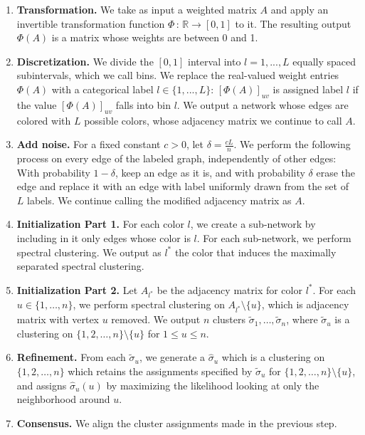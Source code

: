 \documentclass{article}
\begin{document}
\begin{enumerate}
\item \textbf{Transformation.} We take as input a weighted matrix $A$ and apply an invertible transformation function $\Phi \,:\, \mathbb{R} \rightarrow [0,1]$ to it. The resulting output $\Phi(A)$ is a matrix whose weights are between 0 and 1.

\item \textbf{Discretization.} We divide the $[0,1]$ interval into $l=1,...,L$ equally spaced subintervals, which we call bins. We replace the real-valued weight entries $\Phi(A)$ with a categorical label $l \in \{1,...,L\}$: $[\Phi(A)]_{uv}$ is assigned label $l$ if the value $[\Phi(A)]_{uv}$ falls into bin $l$. We output a network whose edges are colored with $L$ possible colors, whose adjacency matrix we continue to call $A$.

\item \textbf{Add noise.} For a fixed constant $c > 0$, let $\delta = \frac{cL}{n}$. We perform the following process on every edge of the labeled graph, independently of other edges: With probability $1-\delta$, keep an edge as it is, and with probability $\delta$ erase the edge and replace it with an edge with label uniformly drawn from the set of $L$ labels. We continue calling the modified adjacency matrix as $A$.

\item \textbf{Initialization Part 1.} For each color $l$, we create a sub-network by including in it only edges whose color is $l$. For each sub-network, we perform spectral clustering. We output as $l^*$ the color that induces the maximally separated spectral clustering. 

\item \textbf{Initialization Part 2.} Let $A_{l^*}$ be the adjacency matrix for color $l^*$. For each $u \in \{1, \dots, n\}$, we perform spectral clustering on $A_{l^*} \setminus \{u\}$, which is adjacency matrix with vertex $u$ removed. We output $n$ clusters $\tilde{\sigma}_1, \dots, \tilde{\sigma}_n$, where $\tilde \sigma_u$ is a clustering on $\{1, 2, \dots, n\} \setminus \{u\}$ for $1 \leq u \leq n$.

\item \textbf{Refinement.} From each $\tilde \sigma_u$, we generate a $\hat \sigma_u$ which is a clustering on $\{1, 2, \dots, n\}$ which retains the assignments specified by $\tilde \sigma_u$ for $\{1, 2, \dots, n\} \setminus \{u\}$, and assigns $\hat \sigma_u(u)$ by maximizing the likelihood looking at only the neighborhood around $u$. 

\item \textbf{Consensus.} We align the cluster assignments made in the previous step. 
\end{enumerate}
\end{document}
